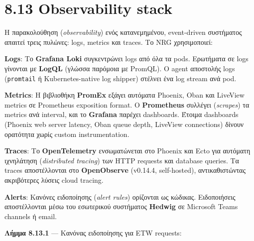 \section{8.13 Observability stack}\label{observability-stack}

Η παρακολούθηση (\emph{observability}) ενός κατανεμημένου, event-driven
συστήματος απαιτεί τρεις πυλώνες: logs, metrics και traces. Το NRG
χρησιμοποιεί:

\textbf{Logs}: Το \textbf{Grafana Loki} συγκεντρώνει logs από όλα τα
pods. Ερωτήματα σε logs γίνονται με \textbf{LogQL} (γλώσσα παρόμοια με
PromQL). Ο agent αποστολής logs (\texttt{promtail} ή Kubernetes-native
log shipper) στέλνει ένα log stream ανά pod.

\textbf{Metrics}: Η βιβλιοθήκη \textbf{PromEx} εξάγει αυτόματα Phoenix,
Oban και LiveView metrics σε Prometheus exposition format. Ο
\textbf{Prometheus} συλλέγει (\emph{scrapes}) τα metrics ανά interval,
και το \textbf{Grafana} παρέχει dashboards. Έτοιμα dashboards (Phoenix
web server latency, Oban queue depth, LiveView connections) δίνουν
ορατότητα χωρίς custom instrumentation.

\textbf{Traces}: Το \textbf{OpenTelemetry} ενσωματώνεται στο Phoenix και
Ecto για αυτόματη ιχνηλάτηση (\emph{distributed tracing}) των HTTP
requests και database queries. Τα traces αποστέλλονται στο
\textbf{OpenObserve} (v0.14.4, self-hosted), αντικαθιστώντας ακριβότερες
λύσεις cloud tracing.

\textbf{Alerts}: Κανόνες ειδοποίησης (\emph{alert rules}) ορίζονται ως
κώδικας. Ειδοποιήσεις αποστέλλονται μέσω του εσωτερικού συστήματος
\textbf{Hedwig} σε Microsoft Teams channels ή email.

\textbf{Λήμμα 8.13.1} --- Κανόνας ειδοποίησης για ETW requests:

\begin{Shaded}
\begin{Highlighting}[]
\KeywordTok{{-}}\AttributeTok{ }\KeywordTok{:}
\AttributeTok{  }\KeywordTok{:}
\AttributeTok{  }\KeywordTok{:}
\AttributeTok{  }\KeywordTok{:}
\AttributeTok{    }\KeywordTok{:}
\AttributeTok{  }\KeywordTok{:}
\AttributeTok{    }\KeywordTok{:}
\AttributeTok{    }\KeywordTok{:}
\AttributeTok{    }\KeywordTok{:}
\end{Highlighting}
\end{Shaded}

